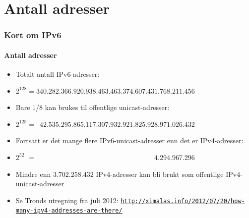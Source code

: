 \section{Antall adresser}
\begin{frame}%
  \frametitle{Kort om IPv6}
  \framesubtitle{Antall adresser}
  \pause
  \begin{itemize}[<+->]
  \item Totalt antall IPv6-adresser:
  \item \(2^{128}=340.282.366.920.938.463.463.374.607.431.768.211.456\)
  \item Bare \(1/8\) kan brukes til offentlige unicast-adresser:
  \item
    \(2^{125}=\phantom{0}42.535.295.865.117.307.932.921.825.928.971.026.432\)
  \item Fortsatt er det mange flere IPv6-unicast-adresser enn det er
    IPv4-adresser:
  \item
    \(2^{32\phantom{0}}=\phantom{000.000.000.000.000.000.000.000.000.00}4.294.967.296\)
  \item Mindre enn \alert<9>{\(3.702.258.432\)} IPv4-adresser kan bli
    brukt som offentlige IPv4-unicast-adresser
  \item Se Tronds utregning fra juli 2012:
    \texttt{\url{http://ximalas.info/2012/07/20/how-many-ipv4-addresses-are-there/}}
  \end{itemize}
\end{frame}

